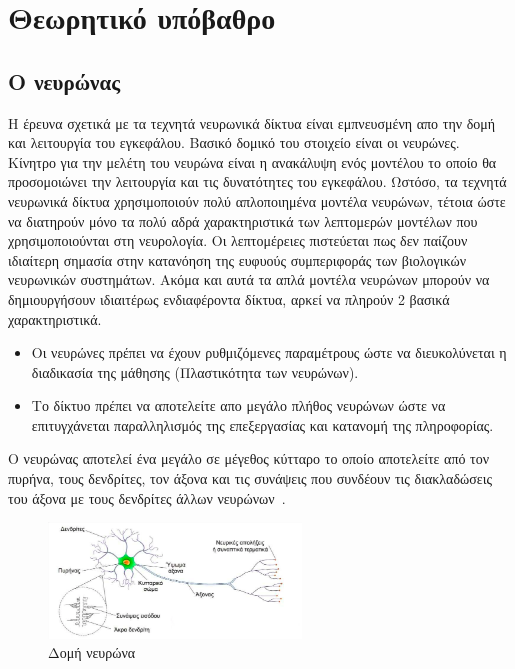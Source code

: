 \documentclass[12pt]{article}
\numberwithin{equation}{section}
\begin{document}
\section{Θεωρητικό υπόβαθρο}

\subsection{Ο νευρώνας}

Η έρευνα σχετικά με τα τεχνητά νευρωνικά δίκτυα είναι εμπνευσμένη απο την δομή και λειτουργία του εγκεφάλου. Βασικό δομικό του στοιχείο είναι  οι νευρώνες. Κίνητρο για την μελέτη του νευρώνα είναι η ανακάλυψη ενός μοντέλου το οποίο θα προσομοιώνει την λειτουργία και τις δυνατότητες του εγκεφάλου. Ωστόσο, τα τεχνητά νευρωνικά δίκτυα χρησιμοποιούν πολύ απλοποιημένα μοντέλα νευρώνων, τέτοια ώστε να διατηρούν μόνο τα πολύ αδρά χαρακτηριστικά των λεπτομερών μοντέλων που χρησιμοποιούνται στη νευρολογία. Οι λεπτομέρειες πιστεύεται πως δεν παίζουν ιδιαίτερη σημασία στην κατανόηση της ευφυούς συμπεριφοράς των βιολογικών νευρωνικών συστημάτων. Ακόμα και αυτά τα απλά μοντέλα νευρώνων μπορούν να δημιουργήσουν ιδιαιτέρως ενδιαφέροντα δίκτυα, αρκεί να πληρούν 2 βασικά χαρακτηριστικά.

\begin{itemize}
    \item Οι νευρώνες πρέπει να έχουν ρυθμιζόμενες παραμέτρους ώστε να διευκολύνεται η διαδικασία της μάθησης (Πλαστικότητα των νευρώνων).
    \item Το δίκτυο πρέπει να αποτελείτε απο μεγάλο πλήθος νευρώνων ώστε να επιτυγχάνεται παραλληλισμός της επεξεργασίας και κατανομή της πληροφορίας.
\end{itemize}

Ο νευρώνας αποτελεί ένα μεγάλο σε μέγεθος κύτταρο το οποίο αποτελείτε από τον πυρήνα, τους δενδρίτες, τον άξονα και τις συνάψεις που συνδέουν τις διακλαδώσεις του άξονα με τους δενδρίτες άλλων νευρώνων~\cite{zhang2019basicneuralunitsbrain}. \\

\begin{figure}[h!]
  \centering
  \includegraphics[width=0.6\textwidth]{images/neuron.png} %
  \caption{Δομή νευρώνα}
  \label{figure 9}
\end{figure}
\end{document}
